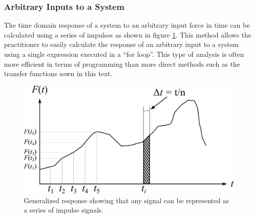 \documentclass[12pt,letter]{article}
\begin{document}
\subsubsection{Arbitrary Inputs to a System}
\label{sec:impulse_inputs}
The time domain response of a system to an arbitrary input force in time can be calculated using a series of impulses as shown in figure \ref{fig:Arbitary_excitation_forces}. This method allows the practitioner to easily calculate the response of an arbitrary input to a system using a single expression executed in a ``for loop''. This type of analysis is often more efficient in terms of programming than more direct methods such as the transfer functions sown in this text. 

\begin{figure}[H]
	\centering
	\includegraphics[]{../figures/Arbitary_excitation_forces.png}
	\caption{Generalized response showing that any signal can be represented as a series of impulse signals. }
	\label{fig:Arbitary_excitation_forces}
\end{figure}
\end{document}
